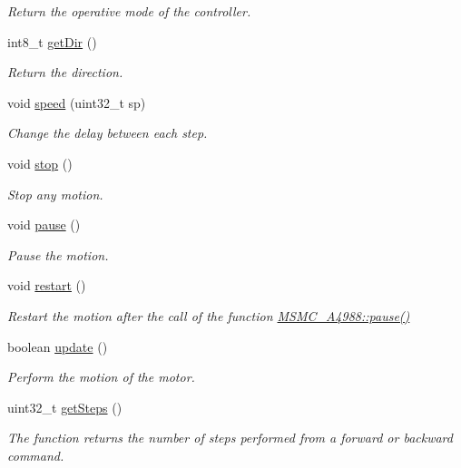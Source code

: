 \begin{DoxyCompactItemize}
\begin{DoxyCompactList}\small\item\em Return the operative mode of the controller. \end{DoxyCompactList}\item 
int8\+\_\+t \hyperlink{class_m_s_m_c___a4988_acf7598266c1ced18507d43f811c98db9}{get\+Dir} ()
\begin{DoxyCompactList}\small\item\em Return the direction. \end{DoxyCompactList}\item 
void \hyperlink{class_m_s_m_c___a4988_a6f9d236dc619342d16457aa029faeed9}{speed} (uint32\+\_\+t sp)
\begin{DoxyCompactList}\small\item\em Change the delay between each step. \end{DoxyCompactList}\item 
void \hyperlink{class_m_s_m_c___a4988_a4038481ce6b8131ea22d5e0d331ca6c7}{stop} ()
\begin{DoxyCompactList}\small\item\em Stop any motion. \end{DoxyCompactList}\item 
void \hyperlink{class_m_s_m_c___a4988_a321bc53bae537a0318910819a6a1a7d5}{pause} ()
\begin{DoxyCompactList}\small\item\em Pause the motion. \end{DoxyCompactList}\item 
void \hyperlink{class_m_s_m_c___a4988_add93aa459190c6edb3551495e75aaded}{restart} ()
\begin{DoxyCompactList}\small\item\em Restart the motion after the call of the function \hyperlink{class_m_s_m_c___a4988_a321bc53bae537a0318910819a6a1a7d5}{M\+S\+M\+C\+\_\+\+A4988\+::pause()} \end{DoxyCompactList}\item 
boolean \hyperlink{class_m_s_m_c___a4988_a409bea28b42827c8bd7d5e5e318af21d}{update} ()
\begin{DoxyCompactList}\small\item\em Perform the motion of the motor. \end{DoxyCompactList}\item 
uint32\+\_\+t \hyperlink{class_m_s_m_c___a4988_ab097e238a4a8c905e478ecff23907059}{get\+Steps} ()
\begin{DoxyCompactList}\small\item\em The function returns the number of steps performed from a forward or backward command. \end{DoxyCompactList}\end{DoxyCompactItemize}


